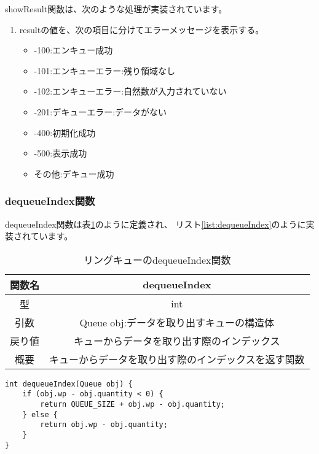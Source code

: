 \documentclass[a4j]{jarticle}
\begin{document}
showResult関数は、次のような処理が実装されています。
\begin{enumerate}
  \item resultの値を、次の項目に分けてエラーメッセージを表示する。
        \begin{itemize}
          \item -100:エンキュー成功
          \item -101:エンキューエラー:残り領域なし
          \item -102:エンキューエラー:自然数が入力されていない
          \item -201:デキューエラー:データがない
          \item -400:初期化成功
          \item -500:表示成功
          \item その他:デキュー成功
        \end{itemize}
\end{enumerate}

\subsubsection{dequeueIndex関数}
dequeueIndex関数は表\ref{table:dequeueIndex}のように定義され、
リスト\ref{list:dequeueIndex}のように実装されています。

\begin{table}[htbp]
  \centering
  \caption{リングキューのdequeueIndex関数}
  \label{table:dequeueIndex}
  \begin{tabular}{|c|c|}
    \hline
    関数名 & dequeueIndex               \\
    \hline
    型   & int                        \\
    \hline
    引数  & Queue obj:データを取り出すキューの構造体  \\
    \hline
    戻り値 & キューからデータを取り出す際のインデックス      \\
    \hline
    概要  & キューからデータを取り出す際のインデックスを返す関数 \\
    \hline
  \end{tabular}
\end{table}

\begin{lstlisting}[caption=リングキューのdequeueIndex関数の実装,label=list:dequeueIndex]
  int dequeueIndex(Queue obj) {
    if (obj.wp - obj.quantity < 0) {
        return QUEUE_SIZE + obj.wp - obj.quantity;
    } else {
        return obj.wp - obj.quantity;
    }
}
\end{lstlisting}
\end{document}
